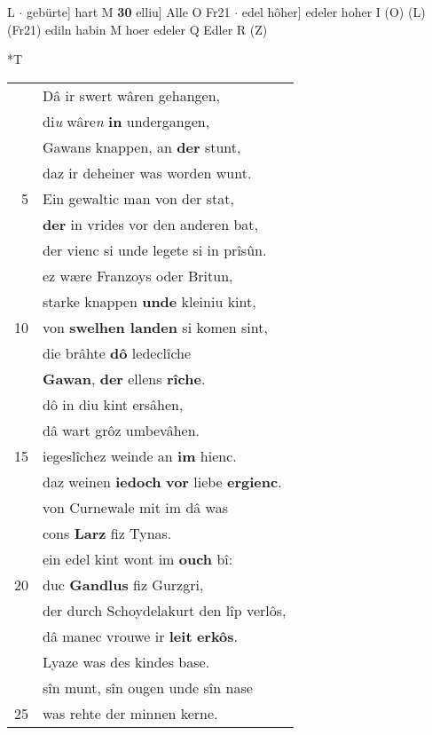 \documentclass[8pt,a4paper,notitlepage]{article}
\begin{document}
\begin{table}[ht]
\begin{minipage}[t]{0.5\linewidth}
L  $\cdot$ gebürte] hart M \textbf{30} elliu] Alle O Fr21  $\cdot$ edel hôher] edeler hoher I (O) (L) (Fr21) ediln habin M hoer edeler Q Edler R (Z) \newline
\end{minipage}
\hspace{0.5cm}
\begin{minipage}[t]{0.5\linewidth}
\small
\begin{center}*T
\end{center}
\begin{tabular}{rl}
 & Dâ ir swert wâren gehangen,\\ 
 & di\textit{u} wâre\textit{n} \textbf{in} undergangen,\\ 
 & Gawans knappen, an \textbf{der} stunt,\\ 
 & daz ir deheiner was worden wunt.\\ 
5 & Ein gewaltic man von der stat,\\ 
 & \textbf{der} in vrides vor den anderen bat,\\ 
 & der vienc si unde legete si in prîsûn.\\ 
 & ez wære Franzoys oder Britun,\\ 
 & starke knappen \textbf{unde} kleiniu kint,\\ 
10 & von \textbf{swelhen landen} si komen sint,\\ 
 & die brâhte \textbf{dô} ledeclîche\\ 
 & \textbf{Gawan}, \textbf{der} ellens \textbf{rîche}.\\ 
 & dô in diu kint ersâhen,\\ 
 & dâ wart grôz umbevâhen.\\ 
15 & iegeslîchez weinde an \textbf{im} hienc.\\ 
 & daz weinen \textbf{iedoch} \textbf{vor} liebe \textbf{ergienc}.\\ 
 & von Curnewale mit im dâ was\\ 
 & cons \textbf{Larz} fiz Tynas.\\ 
 & ein edel kint wont im \textbf{ouch} bî:\\ 
20 & duc \textbf{Gandlus} fiz Gurzgri,\\ 
 & der durch Schoydelakurt den lîp verlôs,\\ 
 & dâ manec vrouwe ir \textbf{leit} \textbf{erkôs}.\\ 
 & Lyaze was des kindes base.\\ 
 & sîn munt, sîn ougen unde sîn nase\\ 
25 & was rehte der minnen kerne.\\ 

\end{tabular}
\end{minipage}
\end{table}
\end{document}
